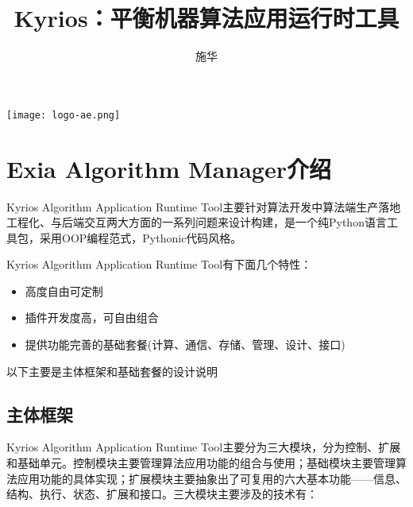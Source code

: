 \documentclass[cn,hazy,blue,14pt,screen]{elegantnote}
\title{Kyrios：平衡机器算法应用运行时工具}
\author{施华}
\institute{Kyrios Algorithm Application Runtime Tool}
\date{\zhtoday}
\begin{document}
\maketitle

\centerline{
  \texttt{[image: logo-ae.png]}
}



\section{Exia Algorithm Manager介绍}

Kyrios Algorithm Application Runtime Tool主要针对算法开发中算法端生产落地工程化、与后端交互两大方面的一系列问题来设计构建，是一个纯Python语言工具包，采用OOP编程范式，Pythonic代码风格。

Kyrios Algorithm Application Runtime Tool有下面几个特性：

\begin{itemize}
  \item 高度自由可定制
  \item 插件开发度高，可自由组合
  \item 提供功能完善的基础套餐(计算、通信、存储、管理、设计、接口)
\end{itemize}

以下主要是主体框架和基础套餐的设计说明



\subsection{主体框架}

Kyrios Algorithm Application Runtime Tool主要分为三大模块，分为控制、扩展和基础单元。控制模块主要管理算法应用功能的组合与使用；基础模块主要管理算法应用功能的具体实现；扩展模块主要抽象出了可复用的六大基本功能——信息、结构、执行、状态、扩展和接口。三大模块主要涉及的技术有：
\end{document}
